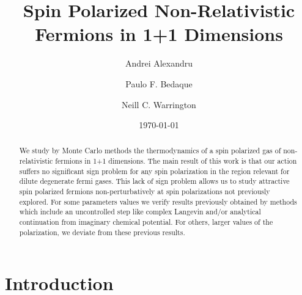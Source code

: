 \documentclass[aps,eqsecnum,amsmath,onecolumn,groupedaddress,superscriptaddress,notitlepage,nofootinbib]{revtex4-1}
\begin{document}
\title{Spin Polarized Non-Relativistic Fermions in 1+1 Dimensions}

\author{Andrei Alexandru}
\author{Paulo F. Bedaque}
\author{Neill C. Warrington}

\date{\today}

\begin{abstract}
We study by Monte Carlo methods the thermodynamics of a spin polarized gas of non-relativistic fermions in 1+1 dimensions.  The main result of this work is that our action suffers no significant sign problem for any spin polarization in the region relevant for dilute degenerate fermi gases. This lack of sign problem allows us to study attractive spin polarized fermions non-perturbatively at spin polarizations not previously explored. For some parameters values we
verify results previously obtained by methods which include an uncontrolled step like complex Langevin and/or analytical continuation from imaginary chemical potential.
For others, larger values of the polarization, we deviate from these previous results.
\end{abstract}


\pacs{}

\maketitle


\section{Introduction}
\end{document}
